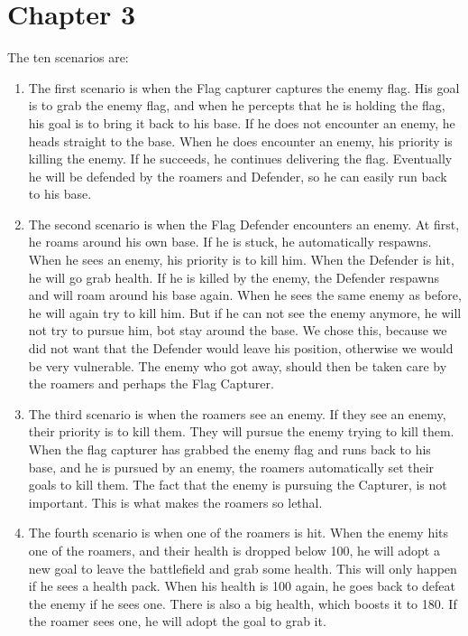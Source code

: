 \chapter{Chapter 3}

The ten scenarios are:
\begin{enumerate}
	\item The first scenario is when the Flag capturer captures the enemy flag. His goal is to grab the enemy flag, and when he percepts that he is holding the flag, his goal is to bring it back to his base. If he does not encounter an enemy, he heads straight to the base. When he does encounter an enemy, his priority is killing the enemy. If he succeeds, he continues delivering the flag. Eventually he will be defended by the roamers and Defender, so he can easily run back to his base.\\
	\item The second scenario is when the Flag Defender encounters an enemy. At first, he roams around his own base. If he is stuck, he automatically respawns. When he sees an enemy, his priority is to kill him. When the Defender is hit, he will go grab health. If he is killed by the enemy, the Defender respawns and will roam around his base again. When he sees the same enemy as before, he will again try to kill him. But if he can not see the enemy anymore, he will not try to pursue him, bot stay around the base. We chose this, because we did not want that the Defender would leave his position, otherwise we would be very vulnerable. The enemy who got away, should then be taken care by the roamers and perhaps the Flag Capturer.\\
	\item The third scenario is when the roamers see an enemy. If they see an enemy, their priority is to kill them. They will pursue the enemy trying to kill them. When the flag capturer has grabbed the enemy flag and runs back to his base, and he is pursued by an enemy, the roamers automatically set their goals to kill them. The fact that the enemy is pursuing the Capturer, is not important. This is what makes the roamers so lethal. \\
	\item The fourth scenario is when one of the roamers is hit. When the enemy hits one of the roamers, and their health is dropped below 100, he will adopt a new goal to leave the battlefield and grab some health. This will only happen if he sees a health pack. When his health is 100 again, he goes back to defeat the enemy if he sees one. There is also a big health, which boosts it to 180. If the roamer sees one, he will adopt the goal to grab it.\\

\end{enumerate}
